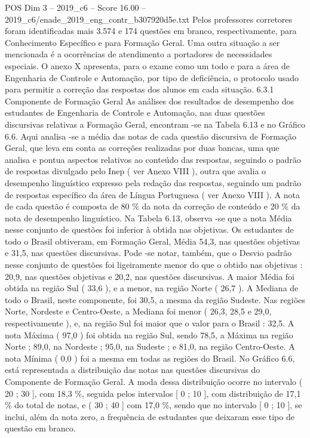 \begin{textsample}{POS Dim 3 – 2019\_c6 – Score 16.00 – 2019\_c6/enade\_2019\_eng\_contr\_b307920d5e.txt}
Pelos professores corretores foram identificadas mais 3.574 e 174 questões em branco, respectivamente, para Conhecimento Específico e para Formação Geral.
Uma outra situação a ser mencionada é a ocorrências de atendimento a portadores de necessidades especiais.
O anexo X apresenta, para o exame como um todo e para a área de Engenharia de Controle e Automação, por tipo de deficiência, o protocolo usado para permitir a correção das respostas dos alunos em cada situação. 6.3.1 Componente de Formação Geral As análises dos resultados de desempenho dos estudantes de Engenharia de Controle e Automação, nas duas questões discursivas relativas a Formação Geral, encontram -se na Tabela 6.13 e no Gráfico 6.6.
Aqui analisa -se a média das notas de cada questão discursiva de Formação Geral, que leva em conta as correções realizadas por duas bancas, uma que analisa e pontua aspectos relativos ao conteúdo das respostas, seguindo o padrão de respostas divulgado pelo Inep ( ver Anexo VIII ), outra que avalia o desempenho linguístico expresso pela redação das respostas, seguindo um padrão de respostas específico da área de Língua Portuguesa ( ver Anexo VIII ).
A nota de cada questão é composta de 80 \% da nota da correção de conteúdo e 20 \% da nota de desempenho linguístico.
Na Tabela 6.13, observa -se que a nota Média nesse conjunto de questões foi inferior à obtida nas objetivas.
Os estudantes de todo o Brasil obtiveram, em Formação Geral, Média 54,3, nas questões objetivas e 31,5, nas questões discursivas.
Pode -se notar, também, que o Desvio padrão nesse conjunto de questões foi ligeiramente menor do que o obtido nas objetivas : 20,9, nas questões objetivas e 20,2, nas questões discursivas.
A maior Média foi obtida na região Sul ( 33,6 ), e a menor, na região Norte ( 26,7 ).
A Mediana de todo o Brasil, neste componente, foi 30,5, a mesma da região Sudeste.
Nas regiões Norte, Nordeste e Centro-Oeste, a Mediana foi menor ( 26,3, 28,5 e 29,0, respectivamente ), e, na região Sul foi maior que o valor para o Brasil : 32,5.
A nota Máxima ( 97,0 ) foi obtida na região Sul, sendo 78,5, a Máxima na região Norte ; 89,0, na Nordeste ; 95,0, na Sudeste ; e 81,0, na região Centro-Oeste.
A nota Mínima ( 0,0 ) foi a mesma em todas as regiões do Brasil.
No Gráfico 6.6, está representada a distribuição das notas nas questões discursivas do Componente de Formação Geral.
A moda dessa distribuição ocorre no intervalo ( 20 ; 30 ], com 18,3 \%, seguida pelos intervalos [ 0 ; 10 ], com distribuição de 17,1 \% do total de notas, e ( 30 ; 40 ] com 17,0 \%, sendo que no intervalo [ 0 ; 10 ], se inclui, além da nota zero, a frequência de estudantes que deixaram esse tipo de questão em branco.

\end{textsample}
